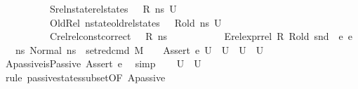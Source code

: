 \begin{isabellebody}
\ \ \ \ \ \ \ \ \ \ Srel{\isacharcolon}{\kern0pt}{\isachardoublequoteopen}nstate{\isacharunderscore}{\kern0pt}rel{\isacharunderscore}{\kern0pt}states\ {\isasymLambda}\ {\isasymLambda}{\isacharprime}{\kern0pt}\ R\ ns\ U{\isachardoublequoteclose}\ \ \isanewline
\ \ \ \ \ \ \ \ \ \ OldRel{\isacharcolon}{\kern0pt}\ {\isachardoublequoteopen}nstate{\isacharunderscore}{\kern0pt}old{\isacharunderscore}{\kern0pt}rel{\isacharunderscore}{\kern0pt}states\ {\isasymLambda}\ {\isasymLambda}{\isacharprime}{\kern0pt}\ R{\isacharunderscore}{\kern0pt}old\ ns\ U{\isachardoublequoteclose}\ \isanewline
\ \ \ \ \ \ \ \ \ \ Crel{\isacharcolon}{\kern0pt}{\isachardoublequoteopen}rel{\isacharunderscore}{\kern0pt}const{\isacharunderscore}{\kern0pt}correct\ {\isasymLambda}\ {\isasymOmega}\ R\ ns{\isachardoublequoteclose}\ \isanewline
\ \ \ \ \ \ \ \ \ \ Erel{\isacharcolon}{\kern0pt}{\isachardoublequoteopen}expr{\isacharunderscore}{\kern0pt}rel\ R\ R{\isacharunderscore}{\kern0pt}old\ {\isacharparenleft}{\kern0pt}snd\ {\isasymLambda}{\isacharparenright}{\kern0pt}\ e{}\ e{}{\isachardoublequoteclose}\isanewline
\ \ \ {\isachardoublequoteopen}{\isacharbraceleft}{\kern0pt}ns{\isacharprime}{\kern0pt}{\isachardot}{\kern0pt}\ Normal\ ns{\isacharprime}{\kern0pt}\ {\isasymin}\ {\isacharparenleft}{\kern0pt}set{\isacharunderscore}{\kern0pt}red{\isacharunderscore}{\kern0pt}cmd\ M\ {\isasymLambda}{\isacharprime}{\kern0pt}\ {\isasymGamma}\ {\isasymOmega}\ {\isacharparenleft}{\kern0pt}Assert\ e{}{\isacharparenright}{\kern0pt}\ U{\isacharparenright}{\kern0pt}{\isacharbraceright}{\kern0pt}\ {\isacharequal}{\kern0pt}\ U{\isachardoublequoteclose}\ {\isacharparenleft}{\kern0pt}\ {\isachardoublequoteopen}{\isacharquery}{\kern0pt}U{\isacharprime}{\kern0pt}\ {\isacharequal}{\kern0pt}\ U{\isachardoublequoteclose}{\isacharparenright}{\kern0pt}\isanewline
%
\isadelimproof
%
\endisadelimproof
%
\isatagproof
{}\isamarkupfalse%
\ \isanewline
\ \ \isamarkupfalse%
\ Apassive{\isacharcolon}{\kern0pt}{\isachardoublequoteopen}isPassive\ {\isacharparenleft}{\kern0pt}Assert\ e{}{\isacharparenright}{\kern0pt}{\isachardoublequoteclose}\ \isamarkupfalse%
\ simp\isanewline
\ \ \isamarkupfalse%
\ {\isachardoublequoteopen}{\isacharquery}{\kern0pt}U{\isacharprime}{\kern0pt}\ {\isasymsubseteq}\ U{\isachardoublequoteclose}\ \isamarkupfalse%
\ {\isacharparenleft}{\kern0pt}rule\ passive{\isacharunderscore}{\kern0pt}states{\isacharunderscore}{\kern0pt}subset{\isacharbrackleft}{\kern0pt}OF\ Apassive{\isacharbrackright}{\kern0pt}{\isacharparenright}{\kern0pt}\isanewline

\end{isabellebody}
